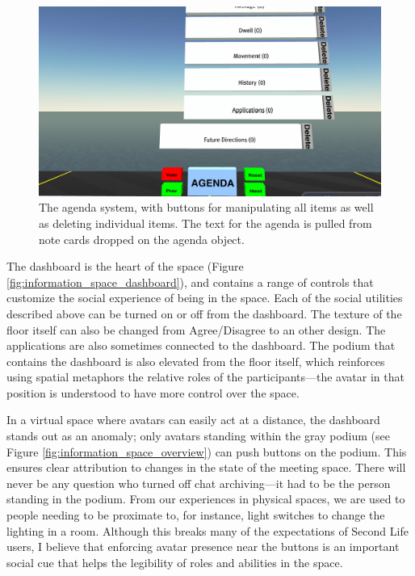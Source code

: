 \begin{figure}[tp]
	\includegraphics{figures/agenda.png}
	\caption{The agenda system, with buttons for manipulating all items as well as deleting individual items. The text for the agenda is pulled from note cards dropped on the agenda object.}
	\label{fig:information_space_agenda}
\end{figure}


The dashboard is the heart of the space (Figure \ref{fig:information_space_dashboard}), and contains a range of controls that customize the social experience of being in the space. Each of the social utilities described above can be turned on or off from the dashboard. The texture of the floor itself can also be changed from Agree/Disagree to an other design. The applications are also sometimes connected to the dashboard. The podium that contains the dashboard is also elevated from the floor itself, which reinforces using spatial metaphors the relative roles of the participants---the avatar in that position is understood to have more control over the space.

In a virtual space where avatars can easily act at a distance, the dashboard stands out as an anomaly; only avatars standing within the gray podium (see Figure \ref{fig:information_space_overview}) can push buttons on the podium. This ensures clear attribution to changes in the state of the meeting space. There will never be any question who turned off chat archiving---it had to be the person standing in the podium. From our experiences in physical spaces, we are used to people needing to be proximate to, for instance, light switches to change the lighting in a room. Although this breaks many of the expectations of Second Life users, I believe that enforcing avatar presence near the buttons is an important social cue that helps the legibility of roles and abilities in the space. 

